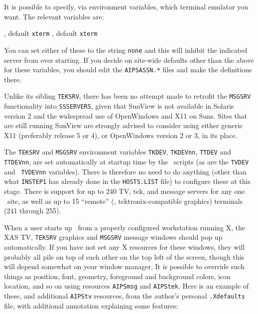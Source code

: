It is possible to specify, via environment variables, which terminal
emulator you want.  The relevant variables are:\medskip

{, default {\tt xterm}}
{, default {\tt xterm}\medskip}\medskip

\noindent You can set either of these to the string {\tt none} and this
will inhibit the indicated server from ever starting.  If you decide on
site-wide defaults other than the above for these variables, you should
edit the {\tt AIPSASSN.*} files and make the definitions there.

Unlike its sibling {\tt TEKSRV}, there has been no attempt made to
retrofit the {\tt MSGSRV} functionality into {\tt SSSERVERS}, given that
SunView is not available in Solaris version 2 and the widespread use of
OpenWindows and X11 on Suns.  Sites that are still running SunView are
strongly advised to consider using either generic X11 (preferably
release 5 or 4), or OpenWindows version 2 or 3, in its place.

The {\tt TEKSRV} and {\tt MSGSRV} environment variables {\tt TKDEV},
{\tt TKDEVnn}, {\tt TTDEV} and {\tt TTDEVnn}, are set automatically at
startup time by the \AIPS\ scripts (as are the {\tt TVDEV} and {\tt
TVDEVnn} variables).  There is therefore no need to do anything (other
than what {\tt INSTEP1} has already done in the {\tt HOSTS.LIST} file)
to configure these at this stage.  There is support for up to 240 TV,
tek, and message servers for any one \AIPS\ site, as well as up to 15
``remote'' (\ie, tektronix-compatible graphics) terminals (241 through
255).

When a user starts up \AIPS\ from a properly configured workstation
running X, the XAS TV, {\tt TEKSRV} graphics and {\tt MSGSRV} message
windows should pop up automatically.  If you have not set any X
resources for these windows, they will probably all pile on top of each
other on the top left of the screen, though this will depend somewhat on
your window manager.  It is possible to override such things as
position, font, geometry, foreground and background colors, icon
location, and so on using resources {\tt AIPSmsg} and {\tt AIPStek}.
Here is an example of these, and additional {\tt AIPStv} resources, from
the author's personal {\tt .Xdefaults} file, with additional annotation
explaining some features:\medskip

